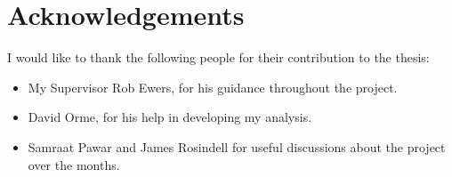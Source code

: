 \clearpage


\section*{Acknowledgements}

 \vspace*{5mm}

I would like to thank the following people for their contribution to the thesis:

 \vspace*{5mm}

\begin{itemize}
 \item My Supervisor Rob Ewers, for his guidance throughout the project.
 \vspace*{5mm}
 \item David Orme, for his help in developing my analysis.
 \vspace*{5mm}
 \item Samraat Pawar and James Rosindell for useful discussions about the project over the months.
\end{itemize}